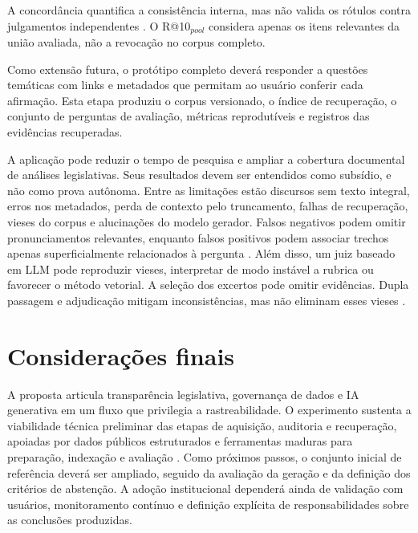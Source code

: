 \documentclass[12pt,a4paper]{article}
\begin{document}
A concordância quantifica a consistência interna, mas não valida os rótulos
contra julgamentos independentes \cite{liuEtAl2025judgeRag,chenEtAl2024judgeBias}.
O R@10$_{pool}$ considera apenas os itens relevantes da união avaliada, não a
revocação no corpus completo.

Como extensão futura, o protótipo completo deverá responder a questões temáticas
com links e metadados que permitam ao usuário conferir cada afirmação. Esta
etapa produziu o corpus versionado, o índice de recuperação, o conjunto de
perguntas de avaliação, métricas reprodutíveis e registros das evidências
recuperadas.

A aplicação pode reduzir o tempo de pesquisa e ampliar a cobertura documental
de análises legislativas. Seus resultados devem ser entendidos como subsídio,
e não como prova autônoma. Entre as limitações estão discursos sem texto
integral, erros nos metadados, perda de contexto pelo truncamento, falhas
de recuperação, vieses do corpus e alucinações do modelo gerador. Falsos
negativos podem omitir pronunciamentos relevantes, enquanto falsos positivos
podem associar trechos apenas superficialmente relacionados à pergunta
\cite{jiEtAl2023hallucinationSurvey}.
Além disso, um juiz baseado em LLM pode reproduzir vieses, interpretar de modo
instável a rubrica ou favorecer o método vetorial. A seleção dos excertos pode
omitir evidências. Dupla passagem e adjudicação mitigam inconsistências, mas não
eliminam esses vieses \cite{chenEtAl2024judgeBias}.

\section{Considerações finais}

A proposta articula transparência legislativa, governança de dados e IA
generativa em um fluxo que privilegia a rastreabilidade. O experimento sustenta
a viabilidade técnica preliminar das etapas de aquisição, auditoria e
recuperação, apoiadas por dados públicos estruturados e ferramentas maduras para
preparação, indexação e avaliação
\cite{manningEtAl2008informationRetrieval,saadFalconEtAl2024ares}. Como próximos
passos, o conjunto inicial de referência deverá ser ampliado, seguido da
avaliação da geração e da definição dos critérios de abstenção. A adoção institucional dependerá ainda de
validação com usuários, monitoramento contínuo e definição explícita de
responsabilidades sobre as conclusões produzidas.


\begingroup
\small
{}

\endgroup
\end{document}
